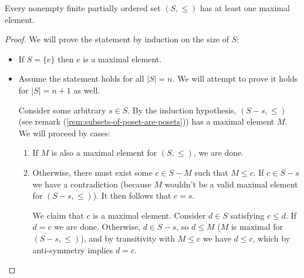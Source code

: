 \begin{lemma}\label{lem:nonempty-finite-posets-have-maximal-elements}
   Every nonempty finite partially ordered set $(S, \leq )$ has at least one maximal element. 
 \end{lemma}

 \begin{proof}
  We will prove the statement by induction on the size of $S$:
  \begin{itemize}
    \item If $S = \{e\}$ then $e$ is a maximal element.
    \item Assume the statement holds for all $|S| = n$. We will attempt to prove it holds for $|S| = n + 1$ as well. 

      Consider some arbitrary $s \in S$. By the induction hypothesis, $(S - s, \leq)$ (see remark (\ref{rem:subsets-of-poset-are-posets})) has a maximal element $M$. We will proceed by cases:
      \begin{enumerate}
        \item If $M$ is also a maximal element for $(S, \leq)$, we are done.
        \item Otherwise, there must exist some $c \in S - M$ such that $M \leq  c$. If $c \in S - s$ we have a contradiction (because $M$ wouldn't be a valid maximal element for $(S - s, \leq )$). It then follows that $c = s$. 

          We claim that $c$ is a maximal element. Consider $d \in S$ satisfying $c \leq d$. If $d = c$ we are done. Otherwise, $d \in S - s$, so $d \leq M$ ($M$ is maximal for $(S - s, \leq )$), and by transitivity with $M \leq c$ we have $d \leq c$, which by anti-symmetry implies $d = c$.
      \end{enumerate}
  \end{itemize}
 \end{proof}
